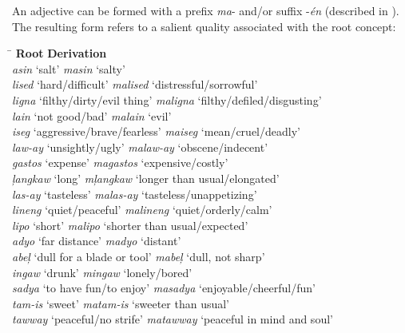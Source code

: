 An adjective can be formed with a prefix \textit{ma}{}- and/or suffix \nobreakdash-\textit{én} (described in ). The resulting form refers to a salient quality associated with the root concept:

\ea
\begin{tabbing}
\hspace{5cm} \= \kill 
\textbf{Root}   \>   \textbf{Derivation} \\
\textit{asin } ‘salt’  \>  \textit{masin } ‘salty' \\
\textit{lised } ‘hard/difficult’ \> \textit{malised } ‘distressful/sorrowful’ \\
\textit{ligna}\footnotemark{}  ‘filthy/dirty/evil thing’ \> \textit{maligna } ‘filthy/defiled/disgusting’ \\
\textit{lain } ‘not good/bad’ \> \textit{malain } ‘evil’ \\
\textit{iseg } ‘aggressive/brave/fearless’ \> \textit{maiseg } ‘mean/cruel/deadly’ \\
\textit{law-ay } ‘unsightly/ugly’ \> \textit{malaw-ay } ‘obscene/indecent’ \\
\textit{gastos } ‘expense’ \> \textit{magastos } ‘expensive/costly’ \\
\textit{ļangkaw } ‘long’ \>   \textit{mļangkaw  } ‘longer than usual/elongated’ \\
\textit{las-ay } ‘tasteless’ \> \textit{malas-ay } ‘tasteless/unappetizing’ \\
\textit{lineng } ‘quiet/peaceful’ \> \textit{malineng } ‘quiet/orderly/calm’ \\
\textit{lipo } ‘short’ \>   \textit{malipo } ‘shorter than usual/expected’ \\
\textit{adyo } ‘far distance’ \> \textit{madyo } ‘distant’ \\
\textit{abeļ } ‘dull for a blade  or tool’ \> \textit{mabeļ } ‘dull, not sharp’ \\
\textit{ingaw } ‘drunk’ \>   \textit{mingaw } ‘lonely/bored’ \\
\textit{sadya } ‘to have fun/to enjoy’ \> \textit{masadya } ‘enjoyable/cheerful/fun’ \\
\textit{tam-is } ‘sweet’  \>  \textit{matam-is } ‘sweeter than usual’ \\
\textit{tawway } ‘peaceful/no strife’ \> \textit{matawway } ‘peaceful in mind and soul’
\end{tabbing}
\z

